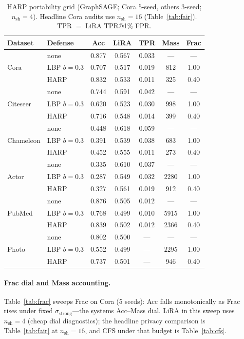 \documentclass[conference]{IEEEtran}
\begin{document}
\begin{table}[!t]
\caption{HARP portability grid (GraphSAGE; Cora 5-seed, others 3-seed; $n_{\mathrm{sh}}{=}4$). Headline Cora audits use $n_{\mathrm{sh}}{=}16$ (Table~\ref{tab:fair}). TPR $=$ LiRA TPR@1\% FPR.}
\label{tab:harp}
\centering
\scriptsize
\setlength{\tabcolsep}{2.5pt}
\begin{tabular}{@{}llccccc@{}}
\toprule
\textbf{Dataset} & \textbf{Defense} & \textbf{Acc} & \textbf{LiRA} & \textbf{TPR} & \textbf{Mass} & \textbf{Frac} \\
\midrule
\multirow{3}{*}{Cora} & none & 0.877 & 0.567 & 0.033 & --- & --- \\
 & LBP $b{=}0.3$ & 0.707 & 0.517 & 0.019 & 812 & 1.00 \\
 & HARP & 0.832 & 0.533 & 0.011 & 325 & 0.40 \\
\multirow{3}{*}{Citeseer} & none & 0.744 & 0.591 & 0.042 & --- & --- \\
 & LBP $b{=}0.3$ & 0.620 & 0.523 & 0.030 & 998 & 1.00 \\
 & HARP & 0.716 & 0.548 & 0.014 & 399 & 0.40 \\
\multirow{3}{*}{Chameleon} & none & 0.448 & 0.618 & 0.059 & --- & --- \\
 & LBP $b{=}0.3$ & 0.391 & 0.539 & 0.038 & 683 & 1.00 \\
 & HARP & 0.452 & 0.555 & 0.011 & 273 & 0.40 \\
\multirow{3}{*}{Actor} & none & 0.335 & 0.610 & 0.037 & --- & --- \\
 & LBP $b{=}0.3$ & 0.287 & 0.549 & 0.032 & 2280 & 1.00 \\
 & HARP & 0.327 & 0.561 & 0.019 & 912 & 0.40 \\
\multirow{3}{*}{PubMed} & none & 0.876 & 0.505 & 0.012 & --- & --- \\
 & LBP $b{=}0.3$ & 0.768 & 0.499 & 0.010 & 5915 & 1.00 \\
 & HARP & 0.839 & 0.502 & 0.012 & 2366 & 0.40 \\
\multirow{3}{*}{Photo} & none & 0.802 & 0.500 & --- & --- & --- \\
 & LBP $b{=}0.3$ & 0.552 & 0.499 & --- & 2295 & 1.00 \\
 & HARP & 0.737 & 0.501 & --- & 946 & 0.40 \\
\bottomrule
\end{tabular}
\end{table}

\paragraph{Frac dial and Mass accounting.}
Table~\ref{tab:frac} sweeps Frac on Cora (5 seeds): Acc falls monotonically as Frac rises under fixed $\sigma_{\mathrm{strong}}$---the systems Acc--Mass dial.
LiRA in this sweep uses $n_{\mathrm{sh}}{=}4$ (cheap dial diagnostics); the headline privacy comparison is Table~\ref{tab:fair} at $n_{\mathrm{sh}}{=}16$, and CFS under that budget is Table~\ref{tab:cfs}.
\end{document}
